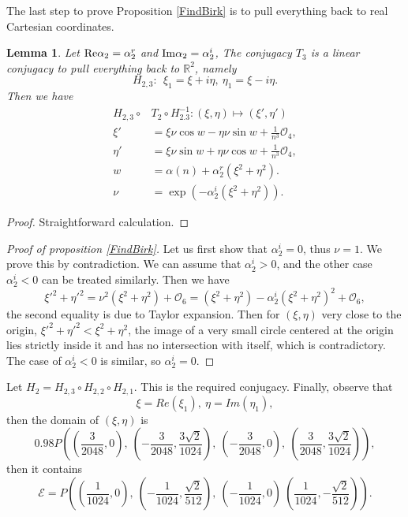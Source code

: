 \documentclass{article}
\numberwithin{figure}{section}
\numberwithin{equation}{section}
\newtheorem{lemma}{Lemma}
\theoremstyle{remark}
\theoremstyle{definition}
\begin{document}
The last step to prove Proposition \ref{FindBirk} is to pull everything back to real Cartesian coordinates.

\begin{lemma}
	Let ${\rm Re}\alpha_2=\alpha_2^r$ and ${\rm Im}\alpha_2=\alpha_2^i$,
	The conjugacy $T_3$ is a linear conjugacy to pull everything back to $\mathbb{R}^2$, namely
\[H_{2,3}:\ \ \xi_1 = \xi + i\eta,\ \eta_1 = \xi - i\eta.\]
Then we have
\begin{align*}
	H_{2,3}\circ &T_2 \circ H_{2.3}^{-1}:\left( \xi,\eta \right) \mapsto \left( \xi',\eta' \right)\\
	\xi' &= \xi\nu\cos w - \eta\nu\sin w + \frac{1}{n^{3}}\mathcal{O}_{4},\\
	\eta' &= \xi\nu\sin w + \eta\nu\cos w + \frac{1}{n^{3}}\mathcal{O}_{4},\\
	w &= \alpha(n) + \alpha_{2}^{r}\left( \xi^{2} + \eta^{2} \right).\\
	\nu &=\exp\left(-\alpha_{2}^{i}\left( \xi^{2} + \eta^{2} \right)\right).
\end{align*}
\end{lemma}
\begin{proof}
	Straightforward calculation.
\end{proof}
\begin{proof}[Proof of proposition \ref{FindBirk}]
	
	Let us first show that $\alpha_2^i=0$, thus $\nu=1$.
	We prove this by contradiction. We can assume that $\alpha_2^i>0$, and the other case $\alpha_2^i<0$ can be treated similarly. Then we have 
	$${\xi'}^2+{\eta'}^2=\nu^2\left({\xi}^2+{\eta}^2\right)+\mathcal{O}_{6}=\left({\xi}^2+{\eta}^2\right)-\alpha_2^i{\left({\xi}^2+{\eta}^2\right)}^2+\mathcal{O}_{6},$$
	the second equality is due to Taylor expansion. Then for $(\xi,\eta)$ very close to the origin, ${\xi'}^2+{\eta'}^2< {\xi}^2+{\eta}^2$, the image of a very small circle centered at the origin lies strictly inside it and has no intersection with itself, which is contradictory. The case of $\alpha_2^i<0$ is similar, so $\alpha_2^i=0$.
\end{proof}	
	Let $H_2=H_{2,3} \circ H_{2,2} \circ H_{2,1}$. This is the required conjugacy.
Finally, observe that
$$\xi=Re(\xi_1),\ \eta= Im(\eta_1),$$
then the domain of $(\xi,\eta)$ is 
$$0.98P\left(	\left(\frac{3}{2048},0\right),\  \left(-\frac{3}{2048},\frac{3\sqrt{2}}{1024}\right),\ \left(-\frac{3}{2048},0\right),\ \left(\frac{3}{2048},\frac{3\sqrt{2}}{1024}\right)\right),$$
then it contains
$$ {\mathcal{E}}=P\left(\left(\frac{1}{1024},0\right),\  \left(-\frac{1}{1024},\frac{\sqrt{2}}{512}\right),\ \left(-\frac{1}{1024},0\right)\  \left(\frac{1}{1024},-\frac{\sqrt{2}}{512}\right)\right).$$
\end{document}
